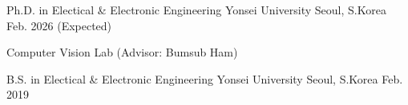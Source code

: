 

\begin{cventries}

  \cventry
    {Ph.D. in Electical \& Electronic Engineering} %
    {Yonsei University} %
    {Seoul, S.Korea} %
    {Feb. 2026 (Expected)} %
    {
      \begin{cvitems} %
        \item {Computer Vision Lab (Advisor: Bumsub Ham)}
      \end{cvitems}
    }
  
  \cventry
    {B.S. in Electical \& Electronic Engineering} %
    {Yonsei University} %
    {Seoul, S.Korea} %
    {Feb. 2019} %
    {}

\end{cventries}
